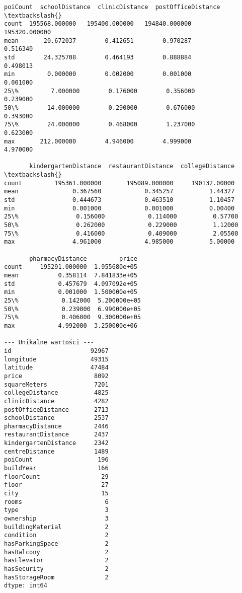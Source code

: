\documentclass[11pt]{article}
\begin{document}
\begin{Verbatim}[commandchars=\\\{\}]
            poiCount  schoolDistance  clinicDistance  postOfficeDistance  \textbackslash{}
count  195568.000000   195400.000000   194840.000000       195320.000000
mean       20.672037        0.412651        0.970287            0.516340
std        24.325708        0.464193        0.888884            0.498013
min         0.000000        0.002000        0.001000            0.001000
25\%         7.000000        0.176000        0.356000            0.239000
50\%        14.000000        0.290000        0.676000            0.393000
75\%        24.000000        0.468000        1.237000            0.623000
max       212.000000        4.946000        4.999000            4.970000

       kindergartenDistance  restaurantDistance  collegeDistance  \textbackslash{}
count         195361.000000       195089.000000     190132.00000
mean               0.367560            0.345257          1.44327
std                0.444673            0.463510          1.10457
min                0.001000            0.001000          0.00400
25\%                0.156000            0.114000          0.57700
50\%                0.262000            0.229000          1.12000
75\%                0.416000            0.409000          2.05500
max                4.961000            4.985000          5.00000

       pharmacyDistance         price
count     195291.000000  1.955680e+05
mean           0.358114  7.841833e+05
std            0.457679  4.097092e+05
min            0.001000  1.500000e+05
25\%            0.142000  5.200000e+05
50\%            0.239000  6.990000e+05
75\%            0.406000  9.300000e+05
max            4.992000  3.250000e+06

--- Unikalne wartości ---
id                      92967
longitude               49315
latitude                47484
price                    8092
squareMeters             7201
collegeDistance          4825
clinicDistance           4282
postOfficeDistance       2713
schoolDistance           2537
pharmacyDistance         2446
restaurantDistance       2437
kindergartenDistance     2342
centreDistance           1489
poiCount                  196
buildYear                 166
floorCount                 29
floor                      27
city                       15
rooms                       6
type                        3
ownership                   3
buildingMaterial            2
condition                   2
hasParkingSpace             2
hasBalcony                  2
hasElevator                 2
hasSecurity                 2
hasStorageRoom              2
dtype: int64


\end{Verbatim}
\end{document}

